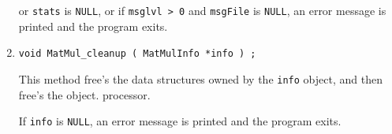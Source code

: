 \begin{enumerate}
or {\tt stats} is {\tt NULL}, 
or if {\tt msglvl > 0} and {\tt msgFile} is {\tt NULL},
an error message is printed and the program exits.
\item
\begin{verbatim}
void MatMul_cleanup ( MatMulInfo *info ) ;
\end{verbatim}
This method free's the data structures owned by the {\tt info}
object, and then free's the object.
processor.
\par {}
If {\tt info} is {\tt NULL}, 
an error message is printed and the program exits.
\end{enumerate}
\par

